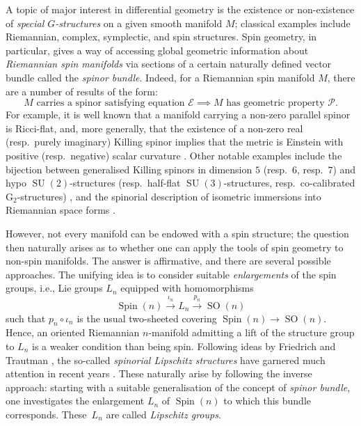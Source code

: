 \documentclass[pdftex]{sigma}
\numberwithin{equation}{section}
\DeclareMathOperator{\SO}{SO}
\DeclareMathOperator{\Spin}{Spin}
\DeclareMathOperator{\SU}{SU}
\begin{document}
		A topic of major interest in differential geometry is the existence or non-existence of \textit{special $G$-structures} on a given smooth manifold $M$; classical examples include Riemannian, complex, symplectic, and spin structures. Spin geometry, in particular, gives a way of accessing global geometric information about \textit{Riemannian spin manifolds} via sections of a certain naturally defined vector bundle called the \emph{spinor bundle}. Indeed, for a Riemannian spin manifold $M$, there are a number of results of the form:
		\begin{equation*}
			\text{$M$ carries a spinor satisfying equation $\mathscr{E}$} \implies \text{$M$ has geometric property $\mathscr{P}$.}
		\end{equation*}
		For example, it is well known that a manifold carrying a non-zero parallel spinor is Ricci-flat, and, more generally, that the existence of a non-zero real (resp.\ purely imaginary) Killing spinor implies that the metric is Einstein with positive (resp.\ negative) scalar curvature \cite{BFGK,Fri80}. Other notable examples include the bijection between generalised Killing spinors in dimension $5$ (resp.~$6$, resp.\ $7$) and hypo $\SU(2)$-structures (resp.\ half-flat $\SU(3)$-structures, resp.\ co-calibrated $\mathrm{G}_2$-structures) \cite{ACFH15,CS07}, and the spinorial description of isometric immersions into Riemannian space forms \cite{BLR,F_immersions,KS}.
		
		However, not every manifold can be endowed with a spin structure; the question then naturally arises as to whether one can apply the tools of spin geometry to non-spin manifolds. The answer is affirmative, and there are several possible approaches. The unifying idea is to consider suitable \textit{enlargements} of the spin groups, i.e., Lie groups $L_n$ equipped with homomorphisms
		\[ \Spin(n) \overset{\iota_n}{\longrightarrow} L_n \overset{p_n}{\longrightarrow} \SO(n) \]
		such that $p_n \circ \iota_n$ is the usual two-sheeted covering $\Spin(n) \to \SO(n)$. Hence, an oriented Riemannian $n$-manifold admitting a lift of the structure group to $L_n$ is a weaker condition than being spin. Following ideas by Friedrich and Trautman \cite{FT}, the so-called \textit{spinorial Lipschitz structures} have garnered much attention in recent years \cite{CS1,CS2,CS3}. These naturally arise by following the inverse approach: starting with a suitable generalisation of the concept of \textit{spinor bundle}, one investigates the enlargement $L_n$ of $\Spin(n)$ to which this bundle corresponds. These~$L_n$ are called \textit{Lipschitz groups}.
		
\end{document}
